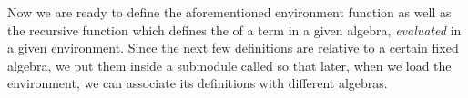 Now we are ready to define the aforementioned environment function 
as well as the recursive function  which defines the  of
a term in a given algebra, \emph{evaluated} in a given environment.  Since the next few
definitions are relative to a certain fixed algebra, we put them inside a submodule called
 so that later, when we load the environment, we can associate its
definitions with different algebras.

\begin{code}%
\>[0]\<%
\\
\>[0]\AgdaSpace{}%
\AgdaSpace{}%
\AgdaSymbol{(}\AgdaSpace{}%
\AgdaSymbol{:}\AgdaSpace{}%
\AgdaSpace{}%
\AgdaSpace{}%
\AgdaSymbol{)}\AgdaSpace{}%
\<%
\\
\>[0][@{}l@{\AgdaIndent{0}}]%
\>[1]\AgdaSpace{}%
\AgdaSpace{}%
\AgdaOperator{\AgdaFunction{𝔻[}}\AgdaSpace{}%
\AgdaSpace{}%
\AgdaOperator{\AgdaFunction{]}}\AgdaSpace{}%
\AgdaSpace{}%
\AgdaSymbol{(}\AgdaSpace{}%
\AgdaSpace{}%
\AgdaSymbol{;}\AgdaSpace{}%
\AgdaSpace{}%
\AgdaSymbol{;}\AgdaSpace{}%
\AgdaSpace{}%
\AgdaSymbol{;}\AgdaSpace{}%
\AgdaSpace{}%
\AgdaSymbol{)}\<%
\\
%
\>[1]\AgdaSpace{}%
\AgdaSymbol{:}\AgdaSpace{}%
\AgdaSpace{}%
\AgdaSpace{}%
\AgdaSpace{}%
\AgdaSpace{}%
\AgdaSymbol{\AgdaUnderscore{}}\AgdaSpace{}%
\AgdaSymbol{\AgdaUnderscore{}}\<%
\\
%
\>[1]\AgdaSpace{}%
\AgdaSpace{}%
\AgdaSymbol{=}\AgdaSpace{}%
%
\>[17]\AgdaSymbol{\{}\AgdaSpace{}%
\AgdaSpace{}%
\AgdaSymbol{=}\AgdaSpace{}%
\AgdaSpace{}%
\AgdaSpace{}%
\AgdaOperator{\AgdaFunction{𝕌[}}\AgdaSpace{}%
\AgdaSpace{}%
\AgdaOperator{\AgdaFunction{]}}\<%
\\
%
\>[17]\AgdaSymbol{;}\AgdaSpace{}%
\AgdaSpace{}%
\AgdaSymbol{=}\AgdaSpace{}%
\AgdaSpace{}%
\AgdaSpace{}%
\AgdaSpace{}%
\AgdaSpace{}%
\AgdaSymbol{(}\AgdaSpace{}%
\AgdaSymbol{:}\AgdaSpace{}%
\AgdaSymbol{)}\AgdaSpace{}%

\end{code}
